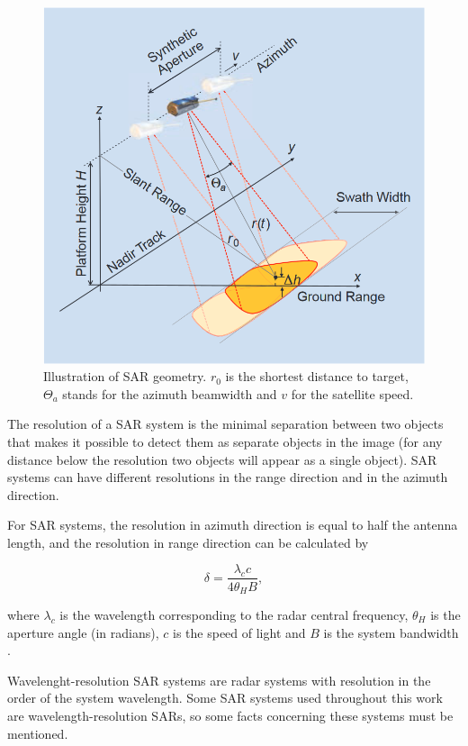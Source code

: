 \begin{figure}[H]
    \centering
    \includegraphics[width=0.8\linewidth]{Cap1-Bib-Review/geometry.png}
    \caption{Illustration of SAR geometry. $r_0$ is the shortest distance to target, $\Theta_a$ stands for the azimuth beamwidth and $v$ for the satellite speed. \cite{tutorial}}
    \label{fig:SAR_geometry}
\end{figure}{}

The resolution of a SAR system is the minimal separation between two objects that makes it possible to detect them as separate objects in the image (for any distance below the resolution two objects will appear as a single object). SAR systems can have different resolutions in the range direction and in the azimuth direction.

For SAR systems, the resolution in azimuth direction is equal to half the antenna length, and the resolution in range direction can be calculated by

\begin{equation}
    \delta = \frac{\lambda_c c}{4 \theta_H B},
\end{equation}

\noindent
where $\lambda_c$ is the wavelength corresponding to the radar central frequency, $\theta_H$
is the aperture angle (in radians), $c$ is the speed of light and $B$ is the system bandwidth \cite{62}.

Wavelenght-resolution SAR systems are radar systems with resolution in the order of the system wavelength. Some SAR systems used throughout this work are wavelength-resolution SARs, so some facts concerning these systems must be mentioned. 

